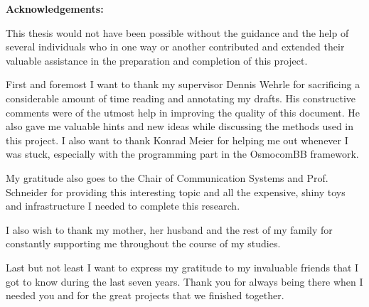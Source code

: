 \begin{center}
\textbf{Acknowledgements:}
\end{center}
This thesis would not have been possible without the guidance and the help of several individuals who in one way or another contributed and extended their valuable assistance in the preparation and completion of this project.

First and foremost I want to thank my supervisor Dennis Wehrle for sacrificing a considerable amount of time reading and annotating my drafts. His constructive comments were of the utmost help in improving the quality of this document.
He also gave me valuable hints and new ideas while discussing the methods used in this project.
I also want to thank Konrad Meier for helping me out whenever I was stuck, especially with the programming part in the OsmocomBB framework.

My gratitude also goes to the Chair of Communication Systems and Prof. Schneider for providing this interesting topic and all the expensive, shiny toys and infrastructure I needed to complete this research.

I also wish to thank my mother, her husband and the rest of my family for constantly supporting me throughout the course of my studies.

Last but not least I want to express my gratitude to my invaluable friends that I got to know during the last seven years.
Thank you for always being there when I needed you and for the great projects that we finished together.



